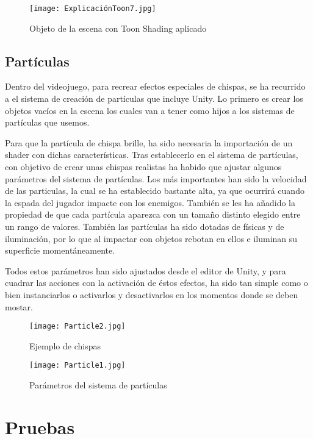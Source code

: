 \begin{figure}[H]
    \centering
    \texttt{[image: ExplicaciónToon7.jpg]}
    \caption{Objeto de la escena con Toon Shading aplicado}
\end{figure}

\subsection{Partículas}

Dentro del videojuego, para recrear efectos especiales de chispas, se ha recurrido a el sistema de creación de partículas que incluye Unity. Lo primero es crear los objetos vacíos en la escena los cuales van a tener como hijos a los sistemas de partículas que usemos.

Para que la partícula de chispa brille, ha sido necesaria la importación de un shader con dichas características. Tras establecerlo en el sistema de partículas, con objetivo de crear unas chispas realistas ha habido que ajustar algunos parámetros del sistema de partículas. Los más importantes han sido la velocidad de las particulas, la cual se ha establecido bastante alta, ya que ocurrirá cuando la espada del jugador impacte con los enemigos. También se les ha añadido la propiedad de que cada partícula aparezca con un tamaño distinto elegido entre un rango  de valores. También las partículas ha sido dotadas de físicas y de iluminación, por lo que al impactar con objetos rebotan en ellos e iluminan su superficie momentáneamente.

Todos estos parámetros han sido ajustados desde el editor de Unity, y para cuadrar las acciones con la activación de éstos efectos, ha sido tan simple como o bien instanciarlos o activarlos y desactivarlos en los momentos donde se deben mostar.

\begin{figure}[H]
    \centering
    \texttt{[image: Particle2.jpg]}
    \caption{Ejemplo de chispas}
\end{figure}


\begin{figure}[H]
    \centering
    \texttt{[image: Particle1.jpg]}
    \caption{Parámetros del sistema de partículas}
\end{figure}

\section{Pruebas}

